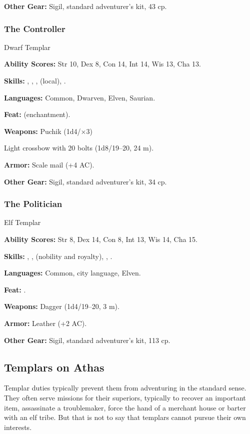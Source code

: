\textbf{Other Gear:} Sigil, standard adventurer's kit, 43 cp.

\subsubsection{The Controller}
Dwarf Templar

\textbf{Ability Scores:} Str 10, Dex 8, Con 14, Int 14, Wis 13, Cha 13.

\textbf{Skills:} , , ,  (local), .

\textbf{Languages:} Common, Dwarven, Elven, Saurian.

\textbf{Feat:}  (enchantment).

\textbf{Weapons:} Puchik (1d4/$\times$3)

Light crossbow with 20 bolts (1d8/19--20, 24 m).

\textbf{Armor:} Scale mail (+4 AC).

\textbf{Other Gear:} Sigil, standard adventurer's kit, 34 cp.

\subsubsection{The Politician}
Elf Templar

\textbf{Ability Scores:} Str 8, Dex 14, Con 8, Int 13, Wis 14, Cha 15.

\textbf{Skills:} , ,  (nobility and royalty), , .

\textbf{Languages:} Common, city language, Elven.

\textbf{Feat:} .

\textbf{Weapons:} Dagger (1d4/19--20, 3 m).

\textbf{Armor:} Leather (+2 AC).

\textbf{Other Gear:} Sigil, standard adventurer's kit, 113 cp.


\subsection{Templars on Athas}
Templar duties typically prevent them from adventuring in the standard sense. They often serve missions for their superiors, typically to recover an important item, assassinate a troublemaker, force the hand of a merchant house or barter with an elf tribe. But that is not to say that templars cannot pursue their own interests.

